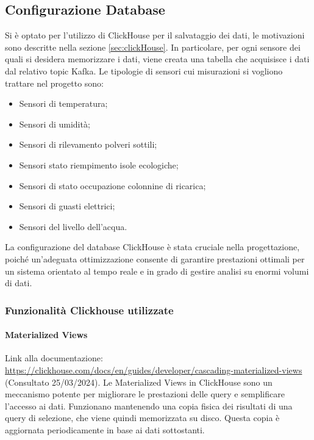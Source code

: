 
\subsection{Configurazione Database}
Si è optato per l'utilizzo di ClickHouse per il salvataggio dei dati, le motivazioni sono descritte nella sezione \ref{sec:clickHouse}. In particolare, per ogni sensore dei quali si desidera memorizzare i dati, viene creata una tabella che acquisisce i dati dal relativo topic Kafka.
Le tipologie di sensori cui misurazioni si vogliono trattare nel progetto sono:
\begin{itemize}
    \item Sensori di temperatura;
    \item Sensori di umidità;
    \item Sensori di rilevamento polveri sottili; 
    \item Sensori stato riempimento isole ecologiche;
    \item Sensori di stato occupazione colonnine di ricarica;
    \item Sensori di guasti elettrici;
    \item Sensori del livello dell'acqua.
\end{itemize}

La configurazione del database ClickHouse è stata cruciale nella progettazione, poiché un'adeguata ottimizzazione consente di garantire prestazioni ottimali per un sistema orientato al tempo reale e in grado di gestire analisi su enormi volumi di dati.


\subsubsection{Funzionalità Clickhouse utilizzate}
\paragraph{Materialized Views}
Link alla documentazione: \href{https://clickhouse.com/docs/en/guides/developer/cascading-materialized-views}{https://clickhouse.com/docs/en/guides/developer/cascading-materialized-views} (Consultato 25/03/2024).\newline
Le Materialized Views in ClickHouse sono un meccanismo potente per migliorare le prestazioni delle query e semplificare l'accesso ai dati. Funzionano mantenendo una copia fisica dei risultati di una query di selezione, che viene quindi memorizzata su disco. Questa copia è aggiornata periodicamente in base ai dati sottostanti.

